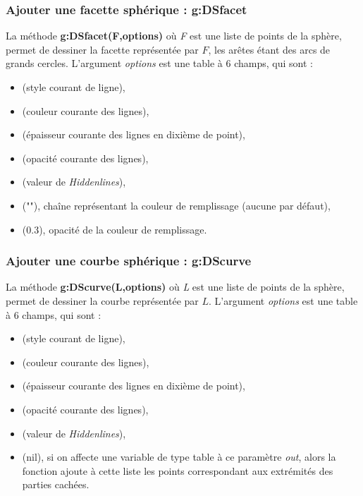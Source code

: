 \subsubsection{Ajouter une facette sphérique : g:DSfacet}

La méthode \textbf{g:DSfacet(F,options)} où \emph{F} est une liste de points de la sphère, permet de dessiner la facette représentée par $F$, les arêtes étant des arcs de grands cercles. L'argument \emph{options} est une table à 6 champs, qui sont :
    \begin{itemize}
        \item {} (style courant de ligne), 
        \item {} (couleur courante des lignes),
        \item {} (épaisseur courante des lignes en dixième de point),
        \item {} (opacité courante des lignes),
        \item {} (valeur de \emph{Hiddenlines}),
        \item {} (""), chaîne représentant la couleur de remplissage (aucune par défaut),
        \item {} (0.3), opacité de la couleur de remplissage.
    \end{itemize}
    
\subsubsection{Ajouter une courbe sphérique : g:DScurve}

La méthode \textbf{g:DScurve(L,options)} où \emph{L} est une liste de points de la sphère, permet de dessiner la courbe représentée par $L$. L'argument \emph{options} est une table à 6 champs, qui sont :
    \begin{itemize}
        \item {} (style courant de ligne), 
        \item {} (couleur courante des lignes),
        \item {} (épaisseur courante des lignes en dixième de point),
        \item {} (opacité courante des lignes),
        \item {} (valeur de \emph{Hiddenlines}),
        \item {} (nil), si on affecte une variable de type table à ce paramètre \emph{out}, alors la fonction ajoute à cette liste les points correspondant aux extrémités des parties cachées.
    \end{itemize}
    
